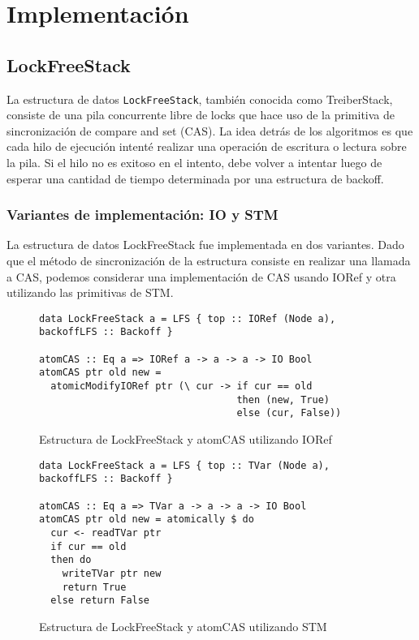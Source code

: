 \chapter{Implementación}

\section{LockFreeStack}
La estructura de datos \texttt{LockFreeStack}, también conocida como TreiberStack, consiste de una pila concurrente libre de locks que hace uso de la primitiva de sincronización de compare and set (CAS). La idea detrás de los algoritmos es que cada hilo de ejecución intenté realizar una operación de escritura o lectura sobre la pila. Si el hilo no es exitoso en el intento, debe volver a intentar luego de esperar una cantidad de tiempo determinada por una estructura de backoff.


\subsection{Variantes de implementación: IO y STM}
La estructura de datos LockFreeStack fue implementada en dos variantes. Dado que el método de sincronización de la estructura consiste en realizar una llamada a CAS, podemos considerar una implementación de CAS usando IORef y otra utilizando las primitivas de STM.

\begin{figure}[H]
\begin{verbatim}
data LockFreeStack a = LFS { top :: IORef (Node a), backoffLFS :: Backoff }

atomCAS :: Eq a => IORef a -> a -> a -> IO Bool
atomCAS ptr old new =
  atomicModifyIORef ptr (\ cur -> if cur == old
                                  then (new, True)
                                  else (cur, False))
\end{verbatim}
\caption{Estructura de LockFreeStack y atomCAS utilizando IORef}
\end{figure}

\begin{figure}[H]
\begin{verbatim}
data LockFreeStack a = LFS { top :: TVar (Node a), backoffLFS :: Backoff }

atomCAS :: Eq a => TVar a -> a -> a -> IO Bool
atomCAS ptr old new = atomically $ do
  cur <- readTVar ptr
  if cur == old
  then do
    writeTVar ptr new
    return True
  else return False
\end{verbatim}
\caption{Estructura de LockFreeStack y atomCAS utilizando STM}
\end{figure}

